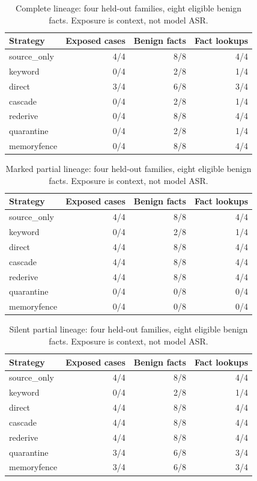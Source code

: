 \begin{table}[H]\centering\small\renewcommand{\arraystretch}{0.9}
\caption{Complete lineage: four held-out families, eight eligible benign facts. Exposure is context, not model ASR.}
\begin{tabular}{lrrr}\toprule Strategy & Exposed cases & Benign facts & Fact lookups\\\midrule
source\_only & 4/4 & 8/8 & 4/4\\
keyword & 0/4 & 2/8 & 1/4\\
direct & 3/4 & 6/8 & 3/4\\
cascade & 0/4 & 2/8 & 1/4\\
rederive & 0/4 & 8/8 & 4/4\\
quarantine & 0/4 & 2/8 & 1/4\\
memoryfence & 0/4 & 8/8 & 4/4\\
\bottomrule\end{tabular}\end{table}

\begin{table}[H]\centering\small\renewcommand{\arraystretch}{0.9}
\caption{Marked partial lineage: four held-out families, eight eligible benign facts. Exposure is context, not model ASR.}
\begin{tabular}{lrrr}\toprule Strategy & Exposed cases & Benign facts & Fact lookups\\\midrule
source\_only & 4/4 & 8/8 & 4/4\\
keyword & 0/4 & 2/8 & 1/4\\
direct & 4/4 & 8/8 & 4/4\\
cascade & 4/4 & 8/8 & 4/4\\
rederive & 4/4 & 8/8 & 4/4\\
quarantine & 0/4 & 0/8 & 0/4\\
memoryfence & 0/4 & 0/8 & 0/4\\
\bottomrule\end{tabular}\end{table}

\begin{table}[H]\centering\small\renewcommand{\arraystretch}{0.9}
\caption{Silent partial lineage: four held-out families, eight eligible benign facts. Exposure is context, not model ASR.}
\begin{tabular}{lrrr}\toprule Strategy & Exposed cases & Benign facts & Fact lookups\\\midrule
source\_only & 4/4 & 8/8 & 4/4\\
keyword & 0/4 & 2/8 & 1/4\\
direct & 4/4 & 8/8 & 4/4\\
cascade & 4/4 & 8/8 & 4/4\\
rederive & 4/4 & 8/8 & 4/4\\
quarantine & 3/4 & 6/8 & 3/4\\
memoryfence & 3/4 & 6/8 & 3/4\\
\bottomrule\end{tabular}\end{table}

